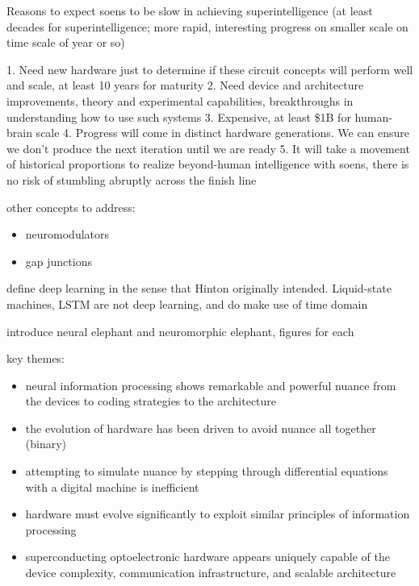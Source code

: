 \documentclass[twocolumn]{article}
\begin{document}
Reasons to expect soens to be slow in achieving superintelligence (at least decades for superintelligence; more rapid, interesting progress on smaller scale on time scale of year or so)

1. Need new hardware just to determine if these circuit concepts will perform well and scale, at least 10 years for maturity
2. Need device and architecture improvements, theory and experimental capabilities, breakthroughs in understanding how to use such systems
3. Expensive, at least \$1B for human-brain scale
4. Progress will come in distinct hardware generations. We can ensure we don't produce the next iteration until we are ready
5. It will take a movement of historical proportions to realize beyond-human intelligence with soens, there is no risk of stumbling abruptly across the finish line

\vspace{3em}
other concepts to address:
\begin{itemize}
\item neuromodulators
\item gap junctions
\end{itemize}

\vspace{3em}
define deep learning in the sense that Hinton originally intended. Liquid-state machines, LSTM are not deep learning, and do make use of time domain
\cite{lebe2015,gobe2016}

\vspace{3em}
introduce neural elephant and neuromorphic elephant, figures for each

\vspace{3em}
key themes:
\begin{itemize}
\item neural information processing shows remarkable and powerful nuance from the devices to coding strategies to the architecture
\item the evolution of hardware has been driven to avoid nuance all together (binary)
\item attempting to simulate nuance by stepping through differential equations with a digital machine is inefficient
\item hardware must evolve significantly to exploit similar principles of information processing
\item superconducting optoelectronic hardware appears uniquely capable of the device complexity, communication infrastructure, and scalable architecture
\end{itemize}
\end{document}
